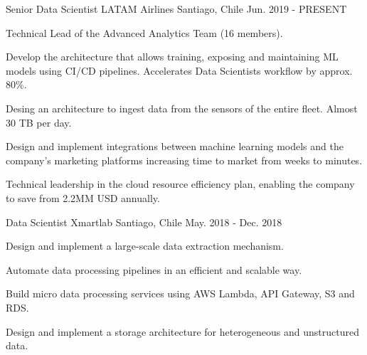 

\begin{cventries}
  \cventry
    {Senior Data Scientist} %
    {LATAM Airlines} %
    {Santiago, Chile} %
    {Jun. 2019 - PRESENT} %
    {
      \begin{cvitems} %
        \item {Technical Lead of the Advanced Analytics Team (16 members).}
        \item {Develop the architecture that allows training, exposing and maintaining ML models using CI/CD pipelines. Accelerates Data Scientists workflow by approx. 80\%.} 
        \item {Desing an architecture to ingest data from the sensors of the entire fleet. Almost 30 TB per day.}
        \item {Design and implement integrations between machine learning models and the company's marketing platforms increasing time to market from weeks to minutes.}
      	\item {Technical leadership in the cloud resource efficiency plan, enabling the company to save from 2.2MM USD annually.}
      \end{cvitems}
    }

  \cventry
    {Data Scientist} %
    {Xmartlab} %
    {Santiago, Chile} %
    {May. 2018 - Dec. 2018} %
    {
      \begin{cvitems} %
        \item {Design and implement a large-scale data extraction mechanism.}
        \item {Automate data processing pipelines in an efficient and scalable way.}
        \item {Build micro data processing services using AWS Lambda, API Gateway, S3 and RDS.}
        \item {Design and implement a storage architecture for heterogeneous and unstructured data.}
      \end{cvitems}
    }


\end{cventries}
